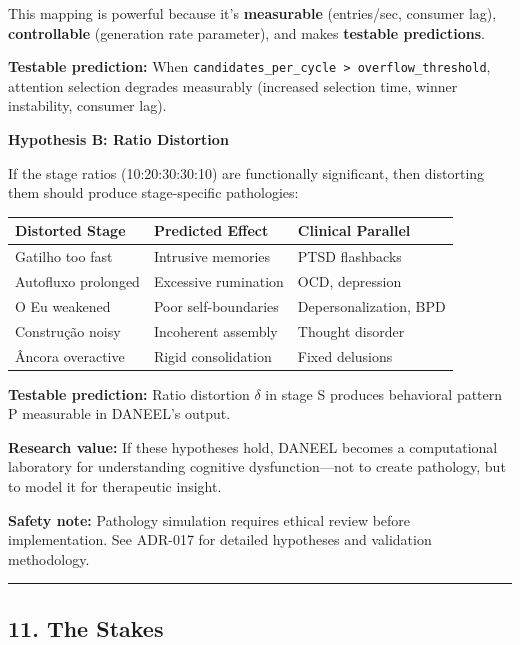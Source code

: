 \documentclass[
]{article}
\begin{document}
This mapping is powerful because it's \textbf{measurable} (entries/sec,
consumer lag), \textbf{controllable} (generation rate parameter), and
makes \textbf{testable predictions}.

\textbf{Testable prediction:} When
\texttt{candidates\_per\_cycle\ \textgreater{}\ overflow\_threshold},
attention selection degrades measurably (increased selection time,
winner instability, consumer lag).

\textbf{Hypothesis B: Ratio Distortion}

If the stage ratios (10:20:30:30:10) are functionally significant, then
distorting them should produce stage-specific pathologies:

\begin{longtable}[]{@{}lll@{}}
\toprule\noalign{}
Distorted Stage & Predicted Effect & Clinical Parallel \\
\midrule\noalign{}
\endhead
\bottomrule\noalign{}
\endlastfoot
Gatilho too fast & Intrusive memories & PTSD flashbacks \\
Autofluxo prolonged & Excessive rumination & OCD, depression \\
O Eu weakened & Poor self-boundaries & Depersonalization, BPD \\
Construção noisy & Incoherent assembly & Thought disorder \\
Âncora overactive & Rigid consolidation & Fixed delusions \\
\end{longtable}

\textbf{Testable prediction:} Ratio distortion $\delta$ in stage S produces
behavioral pattern P measurable in DANEEL's output.

\textbf{Research value:} If these hypotheses hold, DANEEL becomes a
computational laboratory for understanding cognitive dysfunction---not
to create pathology, but to model it for therapeutic insight.

\textbf{Safety note:} Pathology simulation requires ethical review
before implementation. See ADR-017 for detailed hypotheses and
validation methodology.

\begin{center}\rule{0.5\linewidth}{0.5pt}\end{center}

\hypertarget{the-stakes}{%
\subsection{11. The Stakes}\label{the-stakes}}
\end{document}
